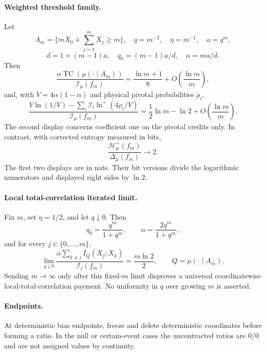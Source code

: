 \paragraph{Weighted threshold family.}
Let
\[
A_m=\{mX_0+\sum_{j=1}^mX_j\ge m\},\quad
q=m^{-2},\quad \eta=m^{-1},\quad a=q^m,
\]
\[
d=1+(m-1)a,\quad q_0=(m-1)a/d,\quad \alpha=ma/d.
\]
Then
\[
\frac{\alpha\operatorname{TC}(\mu(\cdot\mid A_m))}{\mathcal I_\mu(f_m)}
=\frac{\ln m+1}{8}+O\!\left(\frac{\ln m}{m}\right),
\]
and, with $V=4\alpha(1-\alpha)$ and physical pivotal probabilities
$\rho_i$,
\[
\frac{V\ln(1/V)-\sum_i\mathcal I_i\ln^+(4\rho_i/V)}{\mathcal I_\mu(f_m)}
=\frac12\ln m-\ln2+O\!\left(\frac{\ln m}{m}\right).
\]
The second display concerns coefficient one on the pivotal credits only.
In contrast, with corrected entropy measured in bits,
\[
\frac{\mathcal H_\mu^+(f_m)}{\Delta_\mu(f_m)}\longrightarrow2.
\]
The first two displays are in nats.  Their bit versions divide the
logarithmic numerators and displayed right sides by $\ln2$.

\paragraph{Local total-correlation iterated limit.}
Fix $m$, set $\eta=1/2$, and let $q\downarrow0$.  Then
\[
q_0=\frac{q^m}{1+q^m},\qquad \alpha=\frac{2q^m}{1+q^m},
\]
and for every $j\in\{0,\ldots,m\}$,
\[
\lim_{q\downarrow0}
\frac{\alpha\sum_{k\ne j}I_Q(X_j;X_k)}{\mathcal I_j(f_m)}
=\frac{m\ln2}{2},\qquad Q=\mu(\cdot\mid A_m).
\]
Sending $m\to\infty$ only after this fixed-$m$ limit disproves a universal
coordinatewise local-total-correlation payment.  No uniformity in $q$ over
growing $m$ is asserted.

\paragraph{Endpoints.}
At deterministic bias endpoints, freeze and delete deterministic coordinates
before forming a ratio.  In the null or certain-event cases the uncontracted
ratios are $0/0$ and are not assigned values by continuity.
